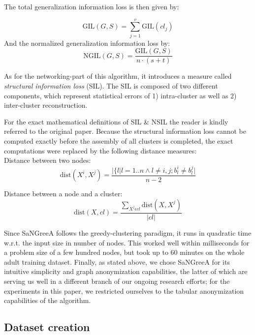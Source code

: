 \documentclass{llncs}
\providecommand{\abs}[1]{\lvert#1\rvert}
\begin{document}
The total generalization information loss is then given by:

\begin{equation*}
\text{GIL}(G,S) = \sum_{j=1}^{v} \text{GIL}(cl_j)
\end{equation*}
And the normalized generalization information loss by:
\begin{equation*}
\text{NGIL}(G,S) = \frac{\text{GIL}(G,S)}{n \cdot (s+t)}
\end{equation*}


As for the networking-part of this algorithm, it introduces a measure called \textit{structural information loss} (SIL). The SIL is composed of two different components, which represent statistical errors of 1) intra-cluster as well as 2) inter-cluster reconstruction.

For the exact mathematical definitions of SIL \& NSIL the reader is kindly referred to the original paper. Because the structural information loss cannot be computed exactly before the assembly of all clusters is completed, the exact computations were replaced by the following distance measures: \\

Distance between two nodes:
\begin{equation*}
\text{dist}(X^i, X^j) = \frac{\abs{\{l|l=1..n \wedge l \ne i,j;b_l^i \ne b_l^j}}{n-2}
\end{equation*}

Distance between a node and a cluster:
\begin{equation*}
\text{dist}(X, cl) = \frac{\sum_{X^j \epsilon cl} \text{dist}(X, X^j) }{\abs{cl}}
\end{equation*}

Since SaNGreeA follows the greedy-clustering paradigm, it runs in quadratic time w.r.t. the input size in number of nodes. This worked well within milliseconds for a problem size of a few hundred nodes, but took up to 60 minutes on the whole adult training dataset. Finally, as stated above, we chose SaNGreeA for its intuitive simplicity and graph anonymization capabilities, the latter of which are serving us well in a different branch of our ongoing research efforts; for the experiments in this paper, we restricted ourselves to the tabular anonymization capabilities of the algorithm.


\subsection{Dataset creation}
\label{ssect:dataset_creation}
\end{document}
